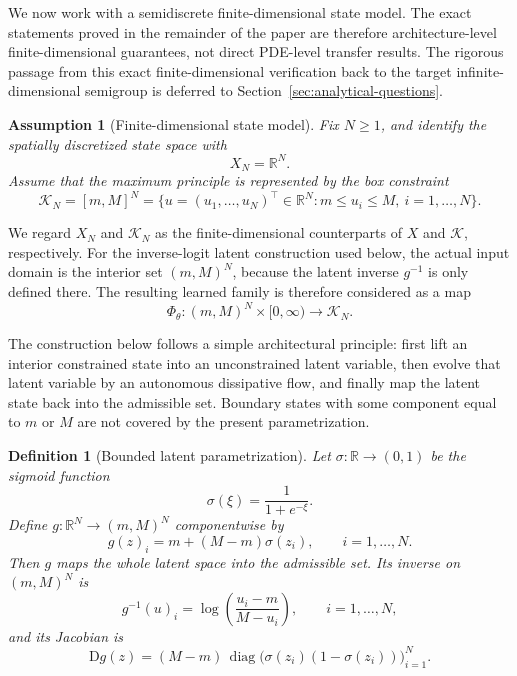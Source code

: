 \documentclass[11pt]{article}
\newtheorem{definition}{Definition}
\newtheorem{assumption}{Assumption}
\newcommand{\R}{\mathbb{R}}
\newcommand{\cK}{\mathcal{K}}
\newcommand{\PhiT}{\Phi_{\theta}}
\newcommand{\diag}{\operatorname{diag}}
\begin{document}
We now work with a semidiscrete finite-dimensional state model. The exact statements proved in the remainder of the paper are therefore architecture-level finite-dimensional guarantees, not direct PDE-level transfer results. The rigorous passage from this exact finite-dimensional verification back to the target infinite-dimensional semigroup is deferred to Section~\ref{sec:analytical-questions}.

\begin{assumption}[Finite-dimensional state model]\label{ass:finite-dim}
Fix \(N\ge 1\), and identify the spatially discretized state space with
\begin{equation}\label{eq:XN}
X_N=\R^N.
\end{equation}
Assume that the maximum principle is represented by the box constraint
\begin{equation}\label{eq:KN}
\cK_N=[m,M]^N=\{u=(u_1,\dots,u_N)^\top\in \R^N : m\le u_i\le M, \ i=1,\dots,N\}.
\end{equation}
\end{assumption}

We regard \(X_N\) and \(\cK_N\) as the finite-dimensional counterparts of \(X\) and \(\cK\), respectively. For the inverse-logit latent construction used below, the actual input domain is the interior set \((m,M)^N\), because the latent inverse \(g^{-1}\) is only defined there. The resulting learned family is therefore considered as a map
\begin{equation}\label{eq:finite-learner}
\PhiT : (m,M)^N\times [0,\infty)\to \cK_N.
\end{equation}

The construction below follows a simple architectural principle: first lift an interior constrained state into an unconstrained latent variable, then evolve that latent variable by an autonomous dissipative flow, and finally map the latent state back into the admissible set. Boundary states with some component equal to \(m\) or \(M\) are not covered by the present parametrization.

\begin{definition}[Bounded latent parametrization]\label{def:latent-map}
Let \(\sigma:\R\to (0,1)\) be the sigmoid function
\begin{equation}\label{eq:sigmoid}
\sigma(\xi)=\frac{1}{1+e^{-\xi}}.
\end{equation}
Define \(g:\R^N\to (m,M)^N\) componentwise by
\begin{equation}\label{eq:g-map}
g(z)_i=m+(M-m)\sigma(z_i), \qquad i=1,\dots,N.
\end{equation}
Then \(g\) maps the whole latent space into the admissible set. Its inverse on \((m,M)^N\) is
\begin{equation}\label{eq:g-inv}
g^{-1}(u)_i=\log\!\left(\frac{u_i-m}{M-u_i}\right), \qquad i=1,\dots,N,
\end{equation}
and its Jacobian is
\begin{equation}\label{eq:Dg}
\mathrm{D}g(z)=(M-m)\,\diag\bigl(\sigma(z_i)(1-\sigma(z_i))\bigr)_{i=1}^N.
\end{equation}
\end{definition}
\end{document}
